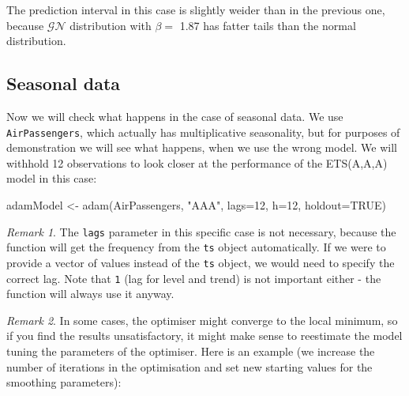 \documentclass[
]{book}
\newenvironment{Shaded}{\begin{snugshade}}{\end{snugshade}}
\newcommand{\AttributeTok}[1]{\textcolor[rgb]{0.77,0.63,0.00}{#1}}
\newcommand{\ConstantTok}[1]{\textcolor[rgb]{0.00,0.00,0.00}{#1}}
\newcommand{\DecValTok}[1]{\textcolor[rgb]{0.00,0.00,0.81}{#1}}
\newcommand{\FunctionTok}[1]{\textcolor[rgb]{0.00,0.00,0.00}{#1}}
\newcommand{\NormalTok}[1]{#1}
\newcommand{\OtherTok}[1]{\textcolor[rgb]{0.56,0.35,0.01}{#1}}
\newcommand{\StringTok}[1]{\textcolor[rgb]{0.31,0.60,0.02}{#1}}
\theoremstyle{definition}
\theoremstyle{definition}
\theoremstyle{definition}
\theoremstyle{definition}
\theoremstyle{remark}
\newtheorem*{remark}{Remark}
\begin{document}
The prediction interval in this case is slightly weider than in the previous one, because \(\mathcal{GN}\) distribution with \(\beta=\) 1.87 has fatter tails than the normal distribution.

\hypertarget{ADAMETSPureAdditiveExamplesETSAAA}{%
\subsection{Seasonal data}\label{ADAMETSPureAdditiveExamplesETSAAA}}

Now we will check what happens in the case of seasonal data. We use \texttt{AirPassengers}, which actually has multiplicative seasonality, but for purposes of demonstration we will see what happens, when we use the wrong model. We will withhold 12 observations to look closer at the performance of the ETS(A,A,A) model in this case:

\begin{Shaded}
\begin{Highlighting}[]
\NormalTok{adamModel }\OtherTok{\textless{}{-}} \FunctionTok{adam}\NormalTok{(AirPassengers, }\StringTok{"AAA"}\NormalTok{, }\AttributeTok{lags=}\DecValTok{12}\NormalTok{, }\AttributeTok{h=}\DecValTok{12}\NormalTok{, }\AttributeTok{holdout=}\ConstantTok{TRUE}\NormalTok{)}
\end{Highlighting}
\end{Shaded}

\begin{remark}

The \texttt{lags} parameter in this specific case is not necessary, because the function will get the frequency from the \texttt{ts} object automatically. If we were to provide a vector of values instead of the \texttt{ts} object, we would need to specify the correct lag. Note that \texttt{1} (lag for level and trend) is not important either - the function will always use it anyway.

\end{remark}

\begin{remark}

In some cases, the optimiser might converge to the local minimum, so if you find the results unsatisfactory, it might make sense to reestimate the model tuning the parameters of the optimiser. Here is an example (we increase the number of iterations in the optimisation and set new starting values for the smoothing parameters):

\end{remark}
\end{document}
